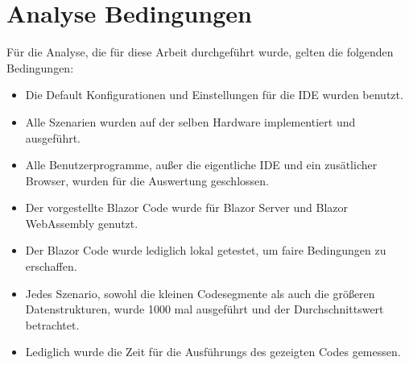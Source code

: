 \section{Analyse Bedingungen}
\label{sec:bedingungen}
Für die Analyse, die für diese Arbeit durchgeführt wurde, gelten die folgenden Bedingungen:

\begin{itemize}
    \item Die Default Konfigurationen und Einstellungen für die IDE wurden benutzt.
    \item Alle Szenarien wurden auf der selben Hardware implementiert und ausgeführt.
    \item Alle Benutzerprogramme, außer die eigentliche IDE und ein zusätlicher Browser, wurden
    für die Auswertung geschlossen.
    \item Der vorgestellte Blazor Code wurde für Blazor Server und Blazor WebAssembly genutzt.
    \item Der Blazor Code wurde lediglich lokal getestet, um faire Bedingungen zu erschaffen.
    \item Jedes Szenario, sowohl die kleinen Codesegmente als auch die größeren Datenstrukturen,
    wurde 1000 mal ausgeführt und der Durchschnittswert betrachtet.
    \item Lediglich wurde die Zeit für die Ausführungs des gezeigten Codes gemessen.
\end{itemize}